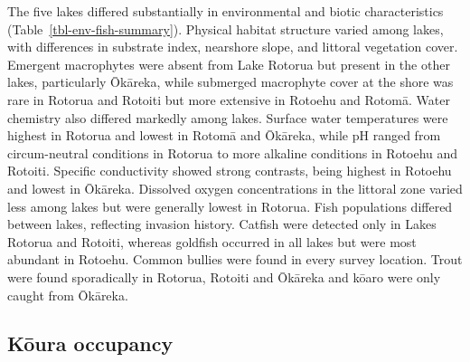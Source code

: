 \documentclass[
  12pt,
  a4paper,
  oneside]{scrbook}
\begin{document}
The five lakes differed substantially in environmental and biotic
characteristics (Table~\ref{tbl-env-fish-summary}). Physical habitat
structure varied among lakes, with differences in substrate index,
nearshore slope, and littoral vegetation cover. Emergent macrophytes
were absent from Lake Rotorua but present in the other lakes,
particularly Ōkāreka, while submerged macrophyte cover at the shore was
rare in Rotorua and Rotoiti but more extensive in Rotoehu and Rotomā.
Water chemistry also differed markedly among lakes. Surface water
temperatures were highest in Rotorua and lowest in Rotomā and Ōkāreka,
while pH ranged from circum-neutral conditions in Rotorua to more
alkaline conditions in Rotoehu and Rotoiti. Specific conductivity showed
strong contrasts, being highest in Rotoehu and lowest in Ōkāreka.
Dissolved oxygen concentrations in the littoral zone varied less among
lakes but were generally lowest in Rotorua. Fish populations differed
between lakes, reflecting invasion history. Catfish were detected only
in Lakes Rotorua and Rotoiti, whereas goldfish occurred in all lakes but
were most abundant in Rotoehu. Common bullies were found in every survey
location. Trout were found sporadically in Rotorua, Rotoiti and Ōkāreka
and kōaro were only caught from Ōkāreka.

\subsection{Kōura occupancy}\label{kux14dura-occupancy}
\end{document}
